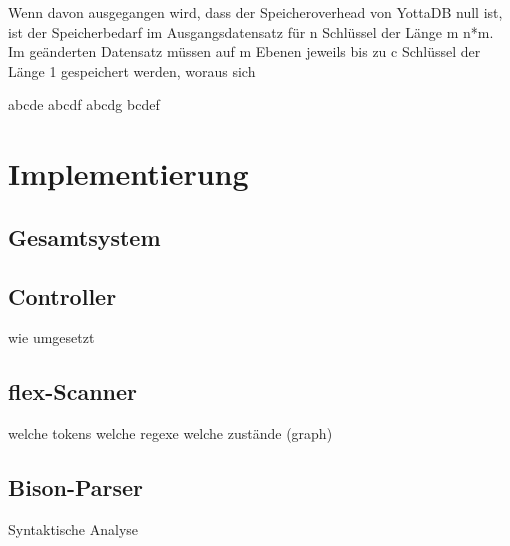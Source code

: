 \documentclass[oneside]{ausarbeitung}
\begin{document}
	
	
Wenn davon ausgegangen wird, dass der Speicheroverhead von YottaDB null ist, ist der Speicherbedarf im Ausgangsdatensatz für n Schlüssel der Länge m n*m. Im geänderten Datensatz müssen auf m Ebenen jeweils bis zu c Schlüssel der Länge 1 gespeichert werden, woraus sich 
	
	
abcde
abcdf
abcdg
bcdef
	
	
	
	











\chapter{Implementierung}
\label{cha:implementierung}

\section{Gesamtsystem}
	
	\section{Controller}
	wie umgesetzt
	
	\section{flex-Scanner}
	welche tokens
	welche regexe
	welche zustände (graph)
	
		
	\section{Bison-Parser}
	Syntaktische Analyse
	
\end{document}
